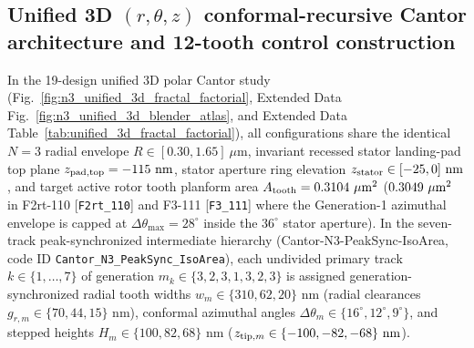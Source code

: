 \documentclass[pdflatex,sn-nature]{sn-jnl}
\DeclareRobustCommand{\roundfour}[1]{\fpeval{round(#1,4)}}
\begin{document}
\subsection*{Unified 3D $(r, \theta, z)$ conformal-recursive Cantor architecture and 12-tooth control construction}
In the 19-design unified 3D polar Cantor study (Fig.~\ref{fig:n3_unified_3d_fractal_factorial}, Extended Data Fig.~\ref{fig:n3_unified_3d_blender_atlas}, and Extended Data Table~\ref{tab:unified_3d_fractal_factorial}), all configurations share the identical $N=3$ radial envelope $R \in [0.30, 1.65]\ \mu\text{m}$, invariant recessed stator landing-pad top plane $z_{\rm pad,top} = -115\text{ nm}$, stator aperture ring elevation $z_{\rm stator} \in [-25, 0]\text{ nm}$, and target active rotor tooth planform area $A_{\rm tooth} = \roundfour{\NthreeUnithreedFzerozerozeroAreaUmtwo}\ \mu\text{m}^2$ ($\roundfour{\NthreeUnithreedFoneoneoneUnifiedAreaUmtwo}\ \mu\text{m}^2$ in F2rt-110 [\texttt{F2rt\_110}] and F3-111 [\texttt{F3\_111}] where the Generation-1 azimuthal envelope is capped at $\Delta\theta_{\max} = 28^\circ$ inside the $36^\circ$ stator aperture). In the seven-track peak-synchronized intermediate hierarchy (Cantor-N3-PeakSync-IsoArea, code ID \texttt{Cantor\_N3\_PeakSync\_IsoArea}), each undivided primary track $k \in \{1,\dots,7\}$ of generation $m_k \in \{3,2,3,1,3,2,3\}$ is assigned generation-synchronized radial tooth widths $w_{m} \in \{310, 62, 20\}\text{ nm}$ (radial clearances $g_{r,m} \in \{70, 44, 15\}\text{ nm}$), conformal azimuthal angles $\Delta\theta_{m} \in \{16^\circ, 12^\circ, 9^\circ\}$, and stepped heights $H_{m} \in \{100, 82, 68\}\text{ nm}$ ($z_{{\rm tip},m} \in \{-100, -82, -68\}\text{ nm}$).
\end{document}
